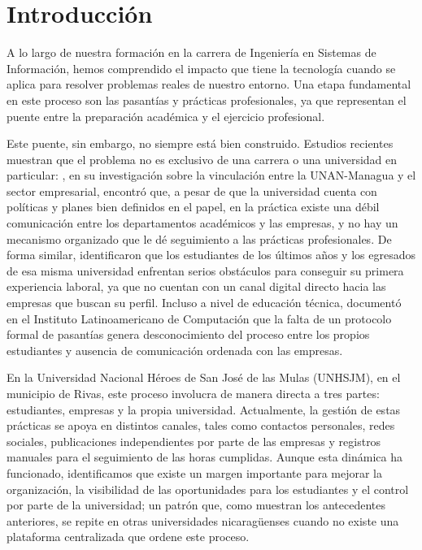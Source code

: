 
\section{Introducción}

A lo largo de nuestra formación en la carrera de Ingeniería en Sistemas de Información, hemos comprendido el impacto que tiene la tecnología cuando se aplica para resolver problemas reales de nuestro entorno. Una etapa fundamental en este proceso son las pasantías y prácticas profesionales, ya que representan el puente entre la preparación académica y el ejercicio profesional.

Este puente, sin embargo, no siempre está bien construido. Estudios recientes muestran que el problema no es exclusivo de una carrera o una universidad en particular: \textcite{aleman2020}, en su investigación sobre la vinculación entre la UNAN-Managua y el sector empresarial, encontró que, a pesar de que la universidad cuenta con políticas y planes bien definidos en el papel, en la práctica existe una débil comunicación entre los departamentos académicos y las empresas, y no hay un mecanismo organizado que le dé seguimiento a las prácticas profesionales. De forma similar, \textcite{iglesiasgaray2017} identificaron que los estudiantes de los últimos años y los egresados de esa misma universidad enfrentan serios obstáculos para conseguir su primera experiencia laboral, ya que no cuentan con un canal digital directo hacia las empresas que buscan su perfil. Incluso a nivel de educación técnica, \textcite{luquez2022} documentó en el Instituto Latinoamericano de Computación que la falta de un protocolo formal de pasantías genera desconocimiento del proceso entre los propios estudiantes y ausencia de comunicación ordenada con las empresas.

En la Universidad Nacional Héroes de San José de las Mulas (UNHSJM), en el municipio de Rivas, este proceso involucra de manera directa a tres partes: estudiantes, empresas y la propia universidad. Actualmente, la gestión de estas prácticas se apoya en distintos canales, tales como contactos personales, redes sociales, publicaciones independientes por parte de las empresas y registros manuales para el seguimiento de las horas cumplidas. Aunque esta dinámica ha funcionado, identificamos que existe un margen importante para mejorar la organización, la visibilidad de las oportunidades para los estudiantes y el control por parte de la universidad; un patrón que, como muestran los antecedentes anteriores, se repite en otras universidades nicaragüenses cuando no existe una plataforma centralizada que ordene este proceso.

